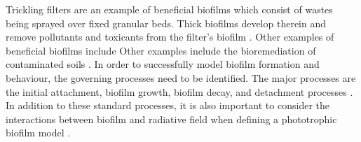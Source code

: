 Trickling filters are an example of beneficial biofilms which consist of wastes being sprayed over fixed granular beds. Thick biofilms develop therein and remove pollutants and toxicants from the filter's biofilm \cite{Donlan2002}. Other examples of beneficial biofilms include 
Other examples include the bioremediation of contaminated soils \cite{Singh2006}. 
\skippingparagraph
In order to successfully model biofilm formation and behaviour, the governing processes need to be identified. The major processes are the initial attachment, biofilm growth, biofilm decay, and detachment processes \cite{Alpkvist2007}. 
In addition to these standard processes, it is also important to consider the interactions between biofilm and radiative field when defining a phototrophic biofilm model \cite{Pollizi2017}. 






